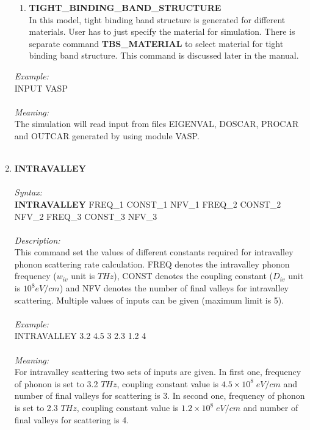 \documentclass[12pt]{article}
\begin{document}
\begin{enumerate}
\begin{enumerate}
        \item \textbf{TIGHT\_BINDING\_BAND\_STRUCTURE} \\
        In this model, tight binding band structure is generated for different materials. User has to just specify the material for simulation. There is separate command \textbf{TBS\_MATERIAL} to select material for tight binding band structure. This command is discussed later in the manual. 
    \end{enumerate}
    
    \textit{Example:} \\ 
    INPUT VASP \\ \\
    \textit{Meaning:} \\    
    The simulation will read input from files EIGENVAL, DOSCAR, PROCAR and OUTCAR generated by using module VASP. \\ \\

    \item \textbf{INTRAVALLEY}   \\ \\
    \textit{Syntax:} \\
    \textbf{INTRAVALLEY} FREQ\_1 CONST\_1 NFV\_1 FREQ\_2 CONST\_2 NFV\_2 FREQ\_3 CONST\_3 NFV\_3 \\ \\
    \textit{Description:} \\
    This command set the values of different constants required for intravalley phonon scattering rate calculation. FREQ denotes the intravalley phonon frequency ($w_{iv}$ unit is $THz$), CONST denotes the coupling constant ($D_{iv} $ unit is $10^8 eV/cm$) and NFV denotes the number of final valleys for intravalley scattering. Multiple values of inputs can be given (maximum limit is 5). \\ \\
    \textit{Example:} \\
    INTRAVALLEY 3.2 4.5 3 2.3 1.2 4 \\ \\
    \textit{Meaning:} \\  
    For intravalley scattering two sets of inputs are given. In first one, frequency of phonon is set to 3.2 $THz$, coupling constant value is $4.5 \times 10^{8} \; eV/cm$ and number of final valleys for scattering is 3. In second one, frequency of phonon is set to 2.3 $THz$, coupling constant value is $1.2 \times 10^{8} \; eV/cm$ and number of final valleys for scattering is 4. \\ \\    



\end{enumerate}
\end{document}
